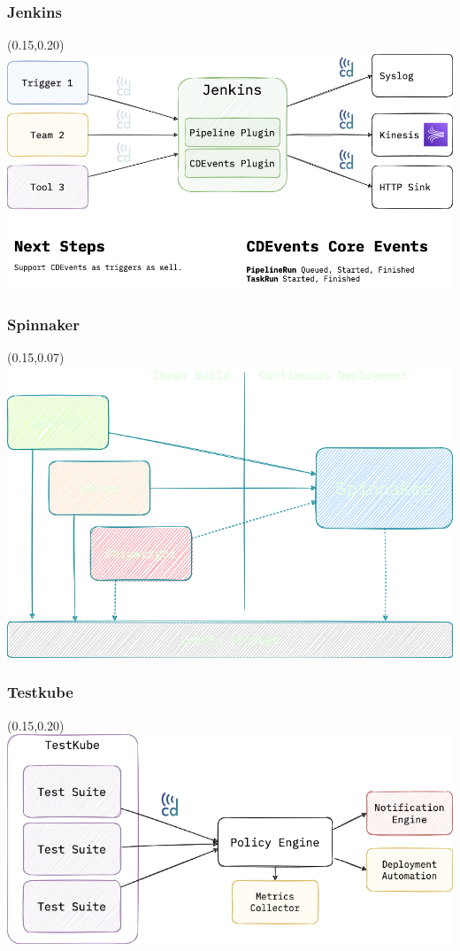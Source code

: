 \documentclass[aspectratio=169,11pt,hyperref={colorlinks=true}]{beamer}
\begin{document}
\begin{grayframe}
  \frametitle{Jenkins}
  \begin{textblock*}{0.70\paperwidth}(0.15\paperwidth,0.20\paperheight)
    \includegraphics[width=0.70\paperwidth]{img/cdevents-Jenkins.png}
  \end{textblock*}
\end{grayframe}

\begin{blackframe}
  \frametitle{Spinnaker}
  \begin{textblock*}{0.70\paperwidth}(0.15\paperwidth,0.07\paperheight)
    \includegraphics[width=0.70\paperwidth]{img/cdevents-Spinnaker.png}
  \end{textblock*}
\end{blackframe}

\begin{grayframe}
  \frametitle{Testkube}
  \begin{textblock*}{0.70\paperwidth}(0.15\paperwidth,0.20\paperheight)
    \includegraphics[width=0.70\paperwidth]{img/cdevents-Testkube.png}
  \end{textblock*}
\end{grayframe}
\end{document}
